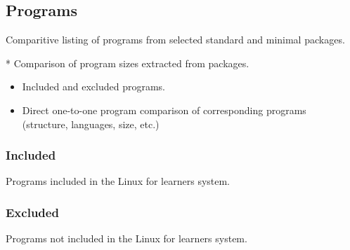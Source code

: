 \subsection{Programs}\label{Programs}

Comparitive listing of programs from selected standard and minimal packages.

* Comparison of program sizes extracted from packages.

\begin{itemize}
    \item Included and excluded programs.
    \item Direct one-to-one program comparison of corresponding programs \\(structure, languages, size, etc.)
\end{itemize}

\subsubsection{Included}

Programs included in the Linux for learners system.

\subsubsection{Excluded}

Programs not included in the Linux for learners system.
